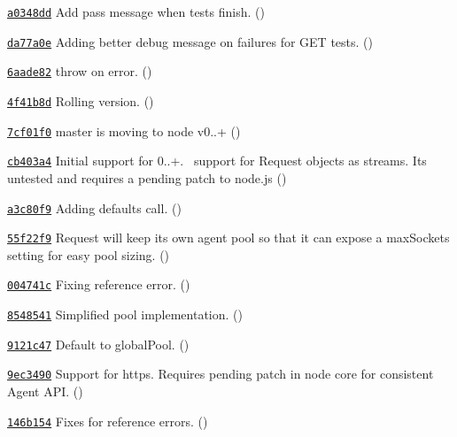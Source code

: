 \begin{DoxyItemize}
\item \href{https://github.com/mikeal/request/commit/a0348dd0fef462c3c678a639619c27101c757035}{\tt a0348dd} Add pass message when tests finish. ()
\item \href{https://github.com/mikeal/request/commit/da77a0e152c1dd43f5c1e698110d23e4d32280db}{\tt da77a0e} Adding better debug message on failures for G\+E\+T tests. ()
\item \href{https://github.com/mikeal/request/commit/6aade822a90724a47176771d137e30b0a702e7ef}{\tt 6aade82} throw on error. ()
\item \href{https://github.com/mikeal/request/commit/4f41b8dbbf9a93c53d5ccdf483c9d7803e279916}{\tt 4f41b8d} Rolling version. ()
\item \href{https://github.com/mikeal/request/commit/7cf01f0481afb367b5d0d4878645ac535cfe9a2e}{\tt 7cf01f0} master is moving to node v0..+ ()
\item \href{https://github.com/mikeal/request/commit/cb403a4cfdbe3d98feb9151fdbdae1e1436e59ab}{\tt cb403a4} Initial support for 0..+.~\newline
 support for Request objects as streams. It\textquotesingle{}s untested and requires a pending patch to node.\+js ()
\item \href{https://github.com/mikeal/request/commit/a3c80f98f42f25d4cb02d5d9e34ba0e67cc89293}{\tt a3c80f9} Adding defaults call. ()
\item \href{https://github.com/mikeal/request/commit/55f22f96365c57aa8687de951e3f9ed982eba408}{\tt 55f22f9} Request will keep it\textquotesingle{}s own agent pool so that it can expose a max\+Sockets setting for easy pool sizing. ()
\item \href{https://github.com/mikeal/request/commit/004741c23dc0eaf61f111161bb913ba418e033e4}{\tt 004741c} Fixing reference error. ()
\item \href{https://github.com/mikeal/request/commit/85485414150fbac58b08126b3684f81dcb930bf1}{\tt 8548541} Simplified pool implementation. ()
\item \href{https://github.com/mikeal/request/commit/9121c47e4cbe47bccc20a75e0e6c6c098dce04fb}{\tt 9121c47} Default to global\+Pool. ()
\item \href{https://github.com/mikeal/request/commit/9ec3490aefd52f05b57e6db13730ace54b4439d1}{\tt 9ec3490} Support for https. Requires pending patch in node core for consistent Agent A\+P\+I. ()
\item \href{https://github.com/mikeal/request/commit/146b154a1a31ae7a30aa9f28e891e4824af548fa}{\tt 146b154} Fixes for reference errors. ()

\end{DoxyItemize}

